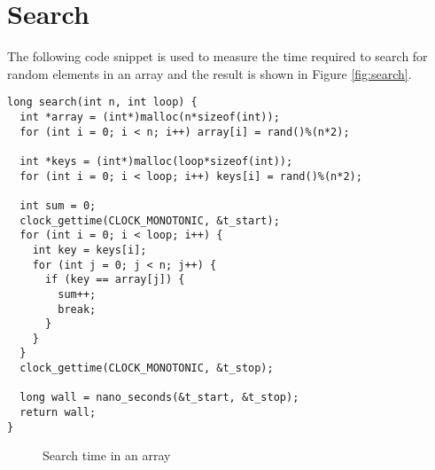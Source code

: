 \documentclass[a4paper,11pt]{article}
\begin{document}
\section*{Search}

The following code snippet is used to measure the time required to search for random elements in
an array and the result is shown in Figure \ref{fig:search}.

\begin{verbatim}
long search(int n, int loop) {
  int *array = (int*)malloc(n*sizeof(int));
  for (int i = 0; i < n; i++) array[i] = rand()%(n*2);
  
  int *keys = (int*)malloc(loop*sizeof(int));
  for (int i = 0; i < loop; i++) keys[i] = rand()%(n*2);

  int sum = 0;
  clock_gettime(CLOCK_MONOTONIC, &t_start);
  for (int i = 0; i < loop; i++) {
    int key = keys[i];
    for (int j = 0; j < n; j++) {
      if (key == array[j]) {
        sum++;
        break;
      }
    }
  }
  clock_gettime(CLOCK_MONOTONIC, &t_stop);

  long wall = nano_seconds(&t_start, &t_stop);
  return wall;
}
\end{verbatim}


\begin{figure}[H]
  \centering
  \caption{Search time in an array}
  \label{fig:search_v1}
\end{figure}
\end{document}
